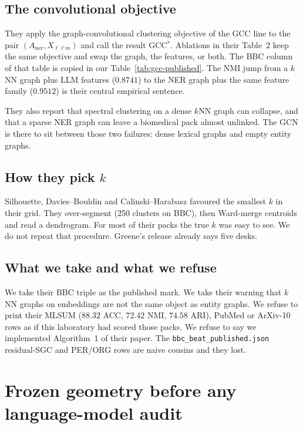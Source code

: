 \documentclass[11pt,a4paper]{article}
\begin{document}
\subsection{The convolutional objective}

They apply the graph-convolutional clustering objective of
the GCC line to the pair $(A_{\mathrm{ner}},X_{\ell\ell m})$
and call the result GCC$^*$. Ablations in their Table~2 keep
the same objective and swap the graph, the features, or both.
The BBC column of that table is copied in our
Table~\ref{tab:gcc-published}. The NMI jump from a $k$NN
graph plus LLM features ($0.8741$) to the NER graph plus the
same feature family ($0.9512$) is their central empirical
sentence.

They also report that spectral clustering on a dense $k$NN
graph can collapse, and that a sparse NER graph can leave a
biomedical pack almost unlinked. The GCN is there to sit
between those two failures: dense lexical graphs and empty
entity graphs.

\subsection{How they pick $k$}

Silhouette, Davies--Bouldin and Calinski--Harabasz favoured
the smallest $k$ in their grid. They over-segment (250
clusters on BBC), then Ward-merge centroids and read a
dendrogram. For most of their packs the true $k$ was easy to
see. We do not repeat that procedure. Greene's release
already says five desks.

\subsection{What we take and what we refuse}

We take their BBC triple as the published mark. We take their
warning that $k$NN graphs on embeddings are not the same
object as entity graphs. We refuse to print their MLSUM
($88.32$ ACC, $72.42$ NMI, $74.58$ ARI), PubMed or ArXiv-10
rows as if this laboratory had scored those packs. We refuse
to say we implemented Algorithm~1 of their paper. The
\texttt{bbc\_beat\_published.json} residual-SGC and PER/ORG
rows are naive cousins and they lost.

\section{Frozen geometry before any language-model audit}
\end{document}
